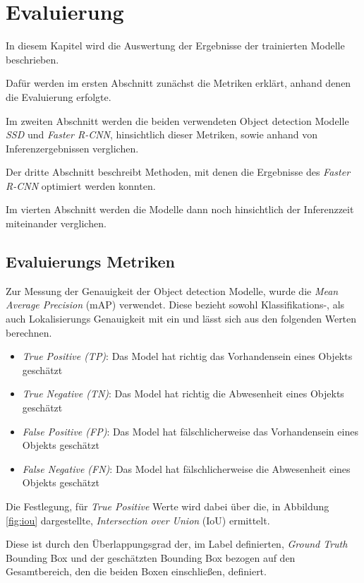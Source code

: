 \chapter{Evaluierung}\label{kap:eval}

In diesem Kapitel wird die Auswertung der 
Ergebnisse der trainierten Modelle beschrieben.

Dafür werden im ersten Abschnitt zunächst die Metriken 
erklärt, anhand denen die Evaluierung erfolgte. 

Im zweiten Abschnitt werden die beiden verwendeten Object detection 
Modelle \textit{SSD} und \textit{Faster R-CNN}, hinsichtlich dieser
Metriken, sowie anhand von Inferenzergebnissen verglichen.

Der dritte Abschnitt beschreibt Methoden, mit denen 
die Ergebnisse des \textit{Faster R-CNN} optimiert werden konnten.

Im vierten Abschnitt werden die Modelle dann noch hinsichtlich 
der Inferenzzeit miteinander verglichen.


\section{Evaluierungs Metriken}\label{sec:metricen}

Zur Messung der Genauigkeit der Object detection Modelle, 
wurde die \textit{Mean Average Precision} (mAP) verwendet.
Diese bezieht sowohl Klassifikations-, als auch
Lokalisierungs Genauigkeit mit ein und
lässt sich aus den folgenden Werten berechnen.

\begin{itemize}
  \item \textit{True Positive (TP)}:
  Das Model hat richtig das Vorhandensein eines Objekts geschätzt
  \item \textit{True Negative (TN)}:
  Das Model hat richtig die Abwesenheit eines Objekts geschätzt
  \item \textit{False Positive (FP)}:
  Das Model hat fälschlicherweise das Vorhandensein eines Objekts
  geschätzt
  \item \textit{False Negative (FN)}:
  Das Model hat fälschlicherweise die Abwesenheit eines Objekts
  geschätzt
\end{itemize}

Die Festlegung, für \textit{True Positive} Werte wird dabei über die,
in Abbildung \ref{fig:iou} dargestellte,
\textit{Intersection over Union} (IoU) ermittelt.

Diese ist durch den Überlappungsgrad der, im Label definierten,
\textit{Ground Truth} Bounding Box und der geschätzten Bounding Box
bezogen auf den Gesamtbereich, den die beiden Boxen einschließen,
definiert.

